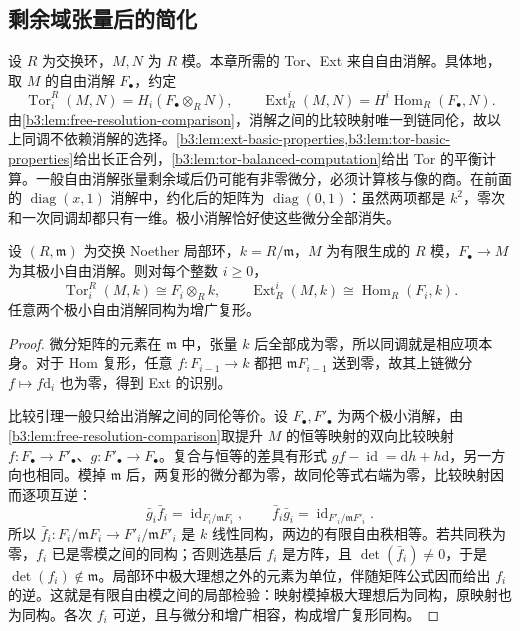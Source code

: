 \subsection{剩余域张量后的简化}
\label{b3:subsec:1701:02}

设 \(R\) 为交换环，\(M,N\) 为 \(R\) 模。本章所需的 Tor、Ext 来自自由消解。具体地，取 \(M\) 的自由消解 \(F_\bullet\)，约定
\[
	\operatorname{Tor}_i^R(M,N)=H_i(F_\bullet\otimes_RN),\qquad \operatorname{Ext}_R^i(M,N)=H^i\operatorname{Hom}_R(F_\bullet,N).
\]
由\cref{b3:lem:free-resolution-comparison}，消解之间的比较映射唯一到链同伦，故以上同调不依赖消解的选择。\cref{b3:lem:ext-basic-properties,b3:lem:tor-basic-properties}给出长正合列，\cref{b3:lem:tor-balanced-computation}给出 Tor 的平衡计算。一般自由消解张量剩余域后仍可能有非零微分，必须计算核与像的商。在前面的 \(\operatorname{diag}(x,1)\) 消解中，约化后的矩阵为 \(\operatorname{diag}(0,1)\)：虽然两项都是 \(k^2\)，零次和一次同调却都只有一维。极小消解恰好使这些微分全部消失。

\begin{proposition}\label{b3:prop:minimal-resolution-betti}
	设 \((R,\mathfrak m)\) 为交换 Noether 局部环，\(k=R/\mathfrak m\)，\(M\) 为有限生成的 \(R\) 模，\(F_\bullet\to M\) 为其极小自由消解。则对每个整数 \(i\ge0\)，
	\[
		\operatorname{Tor}_i^R(M,k)\cong F_i\otimes_Rk, \qquad \operatorname{Ext}_R^i(M,k)\cong\operatorname{Hom}_R(F_i,k).
	\]
	任意两个极小自由消解同构为增广复形。
\end{proposition}
\begin{proof}
	微分矩阵的元素在 \(\mathfrak m\) 中，张量 \(k\) 后全部成为零，所以同调就是相应项本身。对于 Hom 复形，任意 \(f:F_{i-1}\to k\) 都把 \(\mathfrak mF_{i-1}\) 送到零，故其上链微分 \(f\mapsto f\mathrm{d}_i\) 也为零，得到 Ext 的识别。

	比较引理一般只给出消解之间的同伦等价。设 \(F_\bullet,F'_\bullet\) 为两个极小消解，由\cref{b3:lem:free-resolution-comparison}取提升 \(M\) 的恒等映射的双向比较映射 \(f:F_\bullet\to F'_\bullet\)、\(g:F'_\bullet\to F_\bullet\)。复合与恒等的差具有形式 \(gf-\operatorname{id}=\mathrm{d}h+h\mathrm{d}\)，另一方向也相同。模掉 \(\mathfrak m\) 后，两复形的微分都为零，故同伦等式右端为零，比较映射因而逐项互逆：
	\[
		\bar g_i\bar f_i=\operatorname{id}_{F_i/\mathfrak mF_i}, \qquad \bar f_i\bar g_i=\operatorname{id}_{F'_i/\mathfrak mF'_i}.
	\]
	所以 \(\bar f_i:F_i/\mathfrak mF_i\to F'_i/\mathfrak mF'_i\) 是 \(k\) 线性同构，两边的有限自由秩相等。若共同秩为零，\(f_i\) 已是零模之间的同构；否则选基后 \(f_i\) 是方阵，且 \(\det(\bar f_i)\ne0\)，于是 \(\det(f_i)\notin\mathfrak m\)。局部环中极大理想之外的元素为单位，伴随矩阵公式因而给出 \(f_i\) 的逆。这就是有限自由模之间的局部检验：映射模掉极大理想后为同构，原映射也为同构。各次 \(f_i\) 可逆，且与微分和增广相容，构成增广复形同构。
\end{proof}

